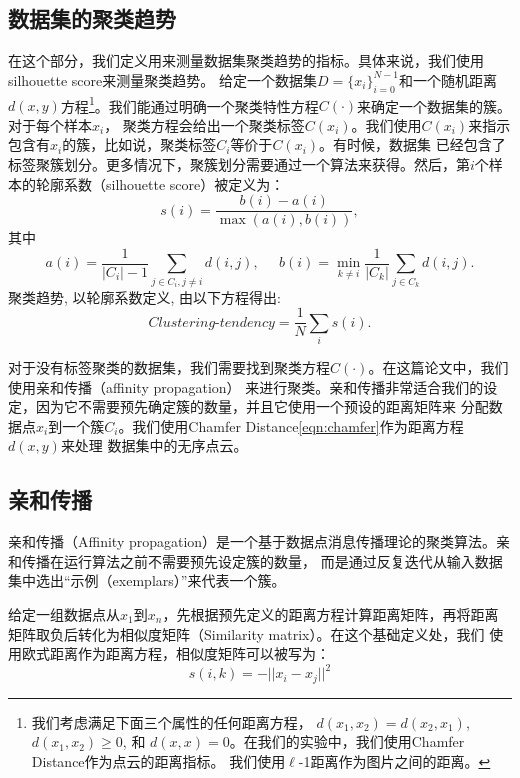 \documentclass[bachelor, nocolorlinks, printoneside]{seuthesis} %
\begin{document}
\begin{Main}
\section{数据集的聚类趋势}
\label{sec:metric_on_dataset}
在这个部分，我们定义用来测量数据集聚类趋势的指标。具体来说，我们使用silhouette score\cite{van2015using}来测量聚类趋势。
给定一个数据集$D = \{x_i\}_{i=0}^{N-1}$和一个随机距离$d(x,y)$方程\footnote[1]{我们考虑满足下面三个属性的任何距离方程，
$d(x_1,x_2)=d(x_2,x_1)$, $d(x_1,x_2)\ge 0$, 和 $d(x,x)=0$。在我们的实验中，我们使用Chamfer Distance作为点云的距离指标。
我们使用$\ell$-1距离作为图片之间的距离。}。我们能通过明确一个聚类特性方程$C(\cdot)$来确定一个数据集的簇。对于每个样本$x_i$，
聚类方程会给出一个聚类标签$C(x_i)$。我们使用$C(x_i)$来指示包含有$x_i$的簇，比如说，聚类标签$C_i$等价于$C(x_i)$。有时候，数据集
已经包含了标签聚簇划分。更多情况下，聚簇划分需要通过一个算法来获得。然后，第$i$个样本的轮廓系数（silhouette score）被定义为：
\begin{equation}
    s(i) = \frac{b(i)-a(i)}{\max(a(i),b(i))},
\end{equation}
其中
\begin{equation}
    a(i) = \frac{1}{|C_i|-1}\sum_{j\in C_i, j\neq i}d(i,j),\;\;\;\;\;
    b(i) = \min_{k\neq i}\frac{1}{|C_k|}\sum_{j\in C_k}d(i,j).
\end{equation}
聚类趋势, 以轮廓系数定义, 由以下方程得出:
\begin{equation}
    \textit{Clustering-tendency} = \frac{1}{N}\sum_i s(i).
\end{equation}

对于没有标签聚类的数据集，我们需要找到聚类方程$C(\cdot)$。在这篇论文中，我们使用亲和传播（affinity propagation）\cite{wang2008adaptive}
来进行聚类。亲和传播非常适合我们的设定，因为它不需要预先确定簇的数量，并且它使用一个预设的距离矩阵来
分配数据点$x_i$到一个簇$C_i$。我们使用Chamfer Distance\eqref{eqn:chamfer}作为距离方程$d(x,y)$来处理
数据集中的无序点云。

\subsection{亲和传播}
亲和传播（Affinity propagation）是一个基于数据点消息传播理论的聚类算法。亲和传播在运行算法之前不需要预先设定簇的数量，
而是通过反复迭代从输入数据集中选出“示例（exemplars）”来代表一个簇。

给定一组数据点从$x_1$到$x_n$，先根据预先定义的距离方程计算距离矩阵，再将距离矩阵取负后转化为相似度矩阵（Similarity matrix）。在这个基础定义处，我们
使用欧式距离作为距离方程，相似度矩阵可以被写为：
\begin{equation}
    s( i , k)= -|| x_i - x_j ||^{2}
\end{equation}


\end{Main}
\end{document}
